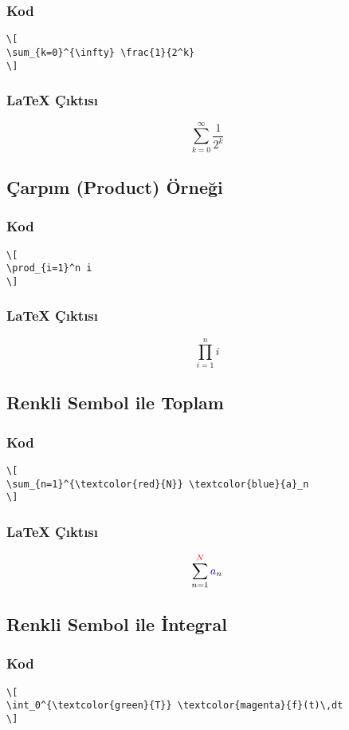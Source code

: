 \documentclass[a4paper,12pt]{article}
\begin{document}
\subsubsection{Kod}
\begin{verbatim}
\[
\sum_{k=0}^{\infty} \frac{1}{2^k}
\]
\end{verbatim}

\subsubsection{\LaTeX{} Çıktısı}
\[
\sum_{k=0}^{\infty} \frac{1}{2^k}
\]

\subsection{Çarpım (Product) Örneği}
\subsubsection{Kod}
\begin{verbatim}
\[
\prod_{i=1}^n i
\]
\end{verbatim}

\subsubsection{\LaTeX{} Çıktısı}
\[
\prod_{i=1}^n i
\]

\subsection{Renkli Sembol ile Toplam}
\subsubsection{Kod}
\begin{verbatim}
\[
\sum_{n=1}^{\textcolor{red}{N}} \textcolor{blue}{a}_n
\]
\end{verbatim}

\subsubsection{\LaTeX{} Çıktısı}
\[
\sum_{n=1}^{\textcolor{red}{N}} \textcolor{blue}{a}_n
\]

\subsection{Renkli Sembol ile İntegral}
\subsubsection{Kod}
\begin{verbatim}
\[
\int_0^{\textcolor{green}{T}} \textcolor{magenta}{f}(t)\,dt
\]
\end{verbatim}
\end{document}
